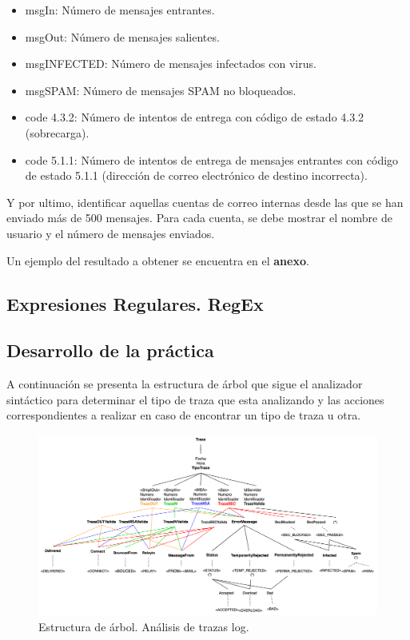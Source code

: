 \begin{itemize}
    \item msgIn: Número de mensajes entrantes.
    \item msgOut: Número de mensajes salientes.
    \item msgINFECTED: Número de mensajes infectados con virus.
    \item msgSPAM: Número de mensajes SPAM no bloqueados.
    \item code 4.3.2: Número de intentos de entrega con código de estado 4.3.2 (sobrecarga).
    \item code 5.1.1: Número de intentos de entrega de mensajes  entrantes con código de estado 5.1.1 (dirección de correo electrónico de destino incorrecta).
\end{itemize}

Y por ultimo, identificar aquellas cuentas de correo internas desde las que se han enviado más de 500 mensajes. Para cada cuenta, se debe mostrar el nombre de usuario y el número de mensajes enviados.

Un ejemplo del resultado a obtener se encuentra en el \textbf{anexo}.

\subsection{Expresiones Regulares. RegEx}

\subsection{Desarrollo de la práctica}

\noindent A continuación se presenta la estructura de árbol que sigue el analizador sintáctico para determinar el tipo de traza que esta analizando y las acciones correspondientes a realizar en caso de encontrar un tipo de traza u otra.

\begin{figure}[H]
    \centering
    \includegraphics[width=\textwidth]{imagenes/arboltraza.png}
    \caption{Estructura de árbol. Análisis de trazas log.}
    \label{fig:arboltraza}
\end{figure}

